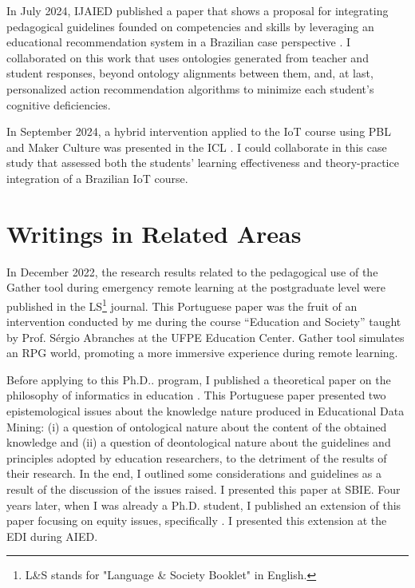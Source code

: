 In July 2024, \gls{IJAIED} published a paper that shows a proposal for integrating pedagogical guidelines founded on competencies and skills by leveraging an educational recommendation system in a Brazilian case perspective \cite{feitosa:2024}. I collaborated on this work that uses ontologies generated from teacher and student responses, beyond ontology alignments between them, and, at last, personalized action recommendation algorithms to minimize each student’s cognitive deficiencies.

In September 2024, a hybrid intervention applied to the \gls{IoT} course using \gls{PBL} and Maker Culture was presented in the \gls{ICL} \cite{cavalcanti:2024}. I could collaborate in this case study that assessed both the students' learning effectiveness and theory-practice integration of a Brazilian \gls{IoT} course.

\section{Writings in Related Areas}
\label{ap-other-writings:related-areas}

In December 2022, the research results related to the pedagogical use of the Gather tool during emergency remote learning at the postgraduate level were published in the \gls{LS}\footnote{L\&S stands for "Language \& Society Booklet" in English.} journal. This Portuguese paper \cite{lima:2022} was the fruit of an intervention conducted by me during the course “Education and Society” taught by Prof. Sérgio Abranches at the \acrfull{UFPE} Education Center. Gather tool simulates an \acrfull{RPG} world, promoting a more immersive experience during remote learning.

Before applying to this \gls{Ph.D.}. program, I published a theoretical paper on the philosophy of informatics in education \cite{bispojr:2019}. This Portuguese paper presented two epistemological issues about the knowledge nature produced in Educational Data Mining: (i) a question of ontological nature about the content of the obtained knowledge and (ii) a question of deontological nature about the guidelines and principles adopted by education researchers, to the detriment of the results of their research. In the end, I outlined some considerations and guidelines as a result of the discussion of the issues raised. I presented this paper at \gls{SBIE}. Four years later, when I was already a \gls{Ph.D.} student, I published an extension of this paper focusing on equity issues, specifically \cite{bispojr:2023-edi}. I presented this extension at the \gls{EDI} during \gls{AIED}.

